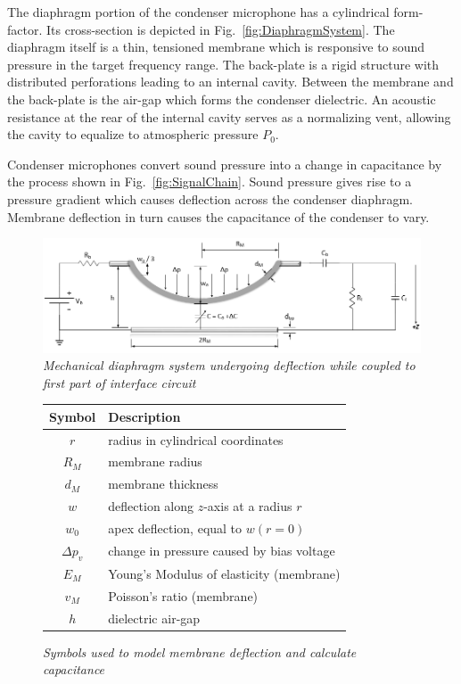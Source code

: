 \documentclass[journal]{IEEEtran}
\begin{document}
The diaphragm portion of the condenser microphone has a cylindrical form-factor. Its cross-section is depicted in Fig.~\ref{fig:DiaphragmSystem}. The diaphragm itself is a thin, tensioned membrane which is responsive to sound pressure in the target frequency range. The back-plate is a rigid structure with distributed perforations leading to an internal cavity. Between the membrane and the back-plate is the air-gap which forms the condenser dielectric. An acoustic resistance at the rear of the internal cavity serves as a normalizing vent, allowing the cavity to equalize to atmospheric pressure $P_0$.

Condenser microphones convert sound pressure into a change in capacitance by the process shown in Fig.~\ref{fig:SignalChain}. Sound pressure gives rise to a pressure gradient which causes deflection across the condenser diaphragm. Membrane deflection in turn  causes the capacitance of the condenser to vary. %

\begin{figure}[ht]
	\centering
	\includegraphics[scale=0.75]{CouplingCircuit2.png}
	\caption{\em Mechanical diaphragm system undergoing deflection while coupled to first part of interface circuit}
	\label{fig:CouplingCircuit}
\end{figure}


\begin{figure}[ht]
	\centering	
	\begin{tabular}{ c | l }
		\hline
		\bf Symbol & \bf Description \\
		\hline
		$r$ & radius in cylindrical coordinates \\
		$R_M$ & membrane radius \\
		$d_M$ & membrane thickness \\
		$w$ & deflection along $z$-axis at a radius $r$ \\
		$w_0$ & apex deflection, equal to $w(r=0)$ \\
		$\Delta p_v$ & change in pressure caused by bias voltage \\
		$E_M$ & Young's Modulus of elasticity (membrane) \\
		$v_M$ & Poisson's ratio (membrane) \\
		$h$ & dielectric air-gap
	\end{tabular}
	
	\caption{\em Symbols used to model membrane deflection and calculate capacitance}
	\label{fig:MembraneSymbols}
\end{figure}
\end{document}
